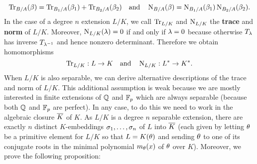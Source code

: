     \begin{equation}\label{equ:trace_and_norm_direct_sums}
      \operatorname{\mathrm{Tr}}_{B/A}(\beta) = \operatorname{\mathrm{Tr}}_{B_{1}/A}(\beta_{1})+\operatorname{\mathrm{Tr}}_{B_{2}/A}(\beta_{2}) \quad \text{and} \quad \operatorname{\mathrm{N}}_{B/A}(\beta) = \operatorname{\mathrm{N}}_{B_{1}/A}(\beta_{1})\operatorname{\mathrm{N}}_{B_{2}/A}(\beta_{2}).
    \end{equation}
    In the case of a degree $n$ extension $L/K$, we call $\operatorname{\mathrm{Tr}}_{L/K}$ and $\operatorname{\mathrm{N}}_{L/K}$ the \textbf{trace} and \textbf{norm} of $L/K$. Moreover, $\operatorname{\mathrm{N}}_{L/K}(\lambda) = 0$ if and only if $\lambda = 0$ because otherwise $T_{\lambda}$ has inverse $T_{\lambda^{-1}}$ and hence nonzero determinant. Therefore we obtain homomorphisms
    \[
      \operatorname{\mathrm{Tr}}_{L/K}:L \to K \quad \text{and} \quad \operatorname{\mathrm{N}}_{L/K}:L^{\ast} \to K^{\ast}.
    \]
    When $L/K$ is also separable, we can derive alternative descriptions of the trace and norm of $L/K$. This additional assumption is weak because we are mostly interested in finite extensions of $\mathbb{Q}$ and $\mathbb{F}_{p}$ which are always separable (because both $\mathbb{Q}$ and $\mathbb{F}_{p}$ are perfect). In any case, to do this we need to work in the algebraic closure $\overline{K}$ of $K$. As $L/K$ is a degree $n$ separable extension, there are exactly $n$ distinct $K$-embeddings $\sigma_{1},\ldots,\sigma_{n}$ of $L$ into $\overline{K}$ (each given by letting $\theta$ be a primitive element for $L/K$ so that $L = K(\theta)$ and sending $\theta$ to one of its conjugate roots in the minimal polynomial $m_{\theta}(x)$ of $\theta$ over $K$). Moreover, we prove the following proposition:

